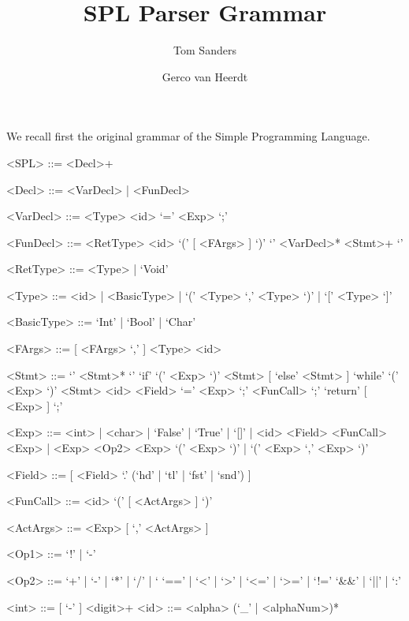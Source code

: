 \documentclass{article}
\title{SPL Parser Grammar}
\author{Tom Sanders \and Gerco van Heerdt}
\begin{document}
\maketitle

We recall first the original grammar of the Simple Programming Language.
\setlength{\grammarindent}{7em}
\begin{grammar}
    <SPL> ::= <Decl>+

    <Decl> ::= <VarDecl> | <FunDecl>

    <VarDecl> ::= <Type> <id> `=' <Exp> `;'

    <FunDecl> ::= <RetType> <id> `(' [ <FArgs> ] `)' `{' <VarDecl>* <Stmt>+ `}'

    <RetType> ::= <Type> | `Void'

    <Type> ::= <id> | <BasicType> | `(' <Type> `,' <Type> `)' | `[' <Type> `]'

    <BasicType> ::= `Int' | `Bool' | `Char'

    <FArgs> ::= [ <FArgs> `,' ] <Type> <id>

    <Stmt> ::= `{' <Stmt>* `}'
    \alt `if' `(' <Exp> `)' <Stmt> [ `else' <Stmt> ]
    \alt `while' `(' <Exp> `)' <Stmt>
    \alt <id> <Field> `=' <Exp> `;'
    \alt <FunCall> `;'
    \alt `return' [ <Exp> ] `;'

    <Exp> ::= <int> | <char> | `False' | `True' | `[]' | <id> <Field>
    \alt <FunCall>
     <Exp> | <Exp> <Op2> <Exp>
    \alt `(' <Exp> `)' | `(' <Exp> `,' <Exp> `)'

    <Field> ::= [ <Field> `.' (`hd' | `tl' | `fst' | `snd') ]

    <FunCall> ::= <id> `(' [ <ActArgs> ] `)'

    <ActArgs> ::= <Exp> [ `,' <ActArgs> ]

    <Op1> ::= `!' | `-'

    <Op2> ::= `+' | `-' | `*' | `/' | `%
    \alt `==' | `<' | `>' | `<=' | `>=' | `!='
    \alt `&&' | `||' | `:'

    <int> ::= [ `-' ] <digit>+
    <id> ::= <alpha> (`_' | <alphaNum>)*
\end{grammar}
\end{document}
